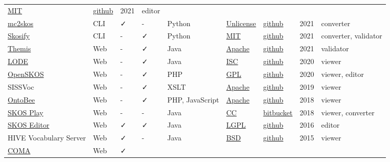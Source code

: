 \documentclass[
  DIV=10]{article}
\begin{document}
\begin{longtable}[]{@{}lllllllll@{}}
\href{https://spdx.org/licenses/MIT}{MIT} &
\href{https://github.com/vocol/vocol}{github} & 2021 & editor \\
\href{https://github.com/scriptotek/mc2skos}{mc2skos} & CLI & ✓ & - &
Python & \href{https://spdx.org/licenses/Unlicense}{Unlicense} &
\href{https://github.com/scriptotek/mc2skos}{github} & 2021 &
converter \\
\href{https://skosify.readthedocs.io/en/latest/}{Skosify} & CLI & - & ✓
& Python & \href{https://spdx.org/licenses/MIT}{MIT} &
\href{https://github.com/NatLibFi/Skosify}{github} & 2021 & converter,
validator \\
\href{http://themis.linkeddata.es/}{Themis} & Web & - & ✓ & Java &
\href{https://spdx.org/licenses/Apache-2.0}{Apache} &
\href{https://github.com/oeg-upm/Themis}{github} & 2021 & validator \\
\href{https://essepuntato.it/lode/}{LODE} & Web & - & ✓ & Java &
\href{https://spdx.org/licenses/ISC}{ISC} &
\href{https://github.com/essepuntato/LODE}{github} & 2020 & viewer \\
\href{http://openskos.org/}{OpenSKOS} & Web & - & ✓ & PHP &
\href{https://spdx.org/licenses/GPL-3.0-or-later}{GPL} &
\href{https://github.com/OpenSKOS/OpenSKOS}{github} & 2020 & viewer,
editor \\
SISSVoc & Web & - & ✓ & XSLT &
\href{https://spdx.org/licenses/Apache-2.0}{Apache} &
\href{https://github.com/SISS/sissvoc}{github} & 2019 & viewer \\
\href{https://ontobee.org/}{OntoBee} & Web & - & ✓ & PHP, JavaScript &
\href{https://spdx.org/licenses/Apache-2.0}{Apache} &
\href{https://github.com/OntoZoo/ontobee}{github} & 2018 & viewer \\
\href{https://skos-play.sparna.fr/play/about}{SKOS Play} & Web & - & - &
Java & \href{https://spdx.org/licenses/CC-BY-SA-4.0}{CC} &
\href{https://bitbucket.org/tfrancart/sparna/src/master/}{bitbucket} &
2018 & viewer, converter \\
\href{https://jbiomedsem.biomedcentral.com/articles/10.1186/s13326-015-0043-z}{SKOS
Editor} & Web & ✓ & ✓ & Java &
\href{https://spdx.org/licenses/LGPL-3.0-or-later}{LGPL} &
\href{https://github.com/Blulab-Utah/SKOSEditor}{github} & 2016 &
editor \\
HIVE Vocabulary Server & Web & ✓ & - & Java &
\href{https://spdx.org/licenses/BSD-3-Clause}{BSD} &
\href{https://github.com/MetadataResearchCenter/hive-mrc}{github} & 2015
& viewer \\
\href{https://sourceforge.net/projects/coma-ce/files/}{COMA} & Web & ✓ &

\end{longtable}
\end{document}
